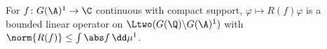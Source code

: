 For $f\colon G(\A)^1\to\C$ continuous with compact support, $\varphi\mapsto R(f)\varphi$ is a bounded linear operator on $\Ltwo(G(\Q)\backslash G(\A)^1)$ with $\norm{R(f)}\le\int\abs f\,\dd\mu^1$.
